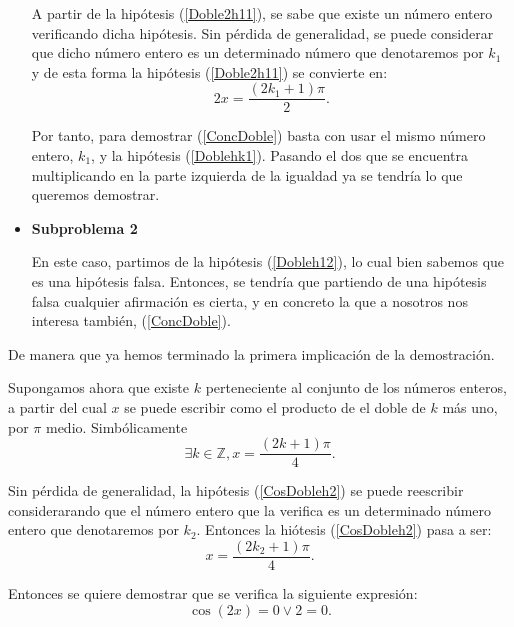\begin{demostracion}
\begin{itemize}
    A partir de la hipótesis (\ref{Doble2h11}), se sabe que existe
    un número entero verificando dicha hipótesis. Sin pérdida de
    generalidad, se puede considerar que dicho número entero es un
    determinado número que denotaremos por \(k_1\) y de esta forma
    la hipótesis (\ref{Doble2h11}) se convierte en:
    \begin{equation}\label{Doblehk1}\tag{hk1}
       2x=\frac{(2k_1+1)π}{2}.
    \end{equation}

    Por tanto, para demostrar (\ref{ConcDoble}) basta con usar
    el mismo número entero, \(k_1\), y la hipótesis
    (\ref{Doblehk1}). Pasando el dos que se encuentra multiplicando
    en la parte izquierda de la igualdad ya se tendría lo que
    queremos demostrar.

  \item \textbf{Subproblema 2}

    En este caso, partimos de la hipótesis (\ref{Dobleh12}), lo cual
    bien sabemos que es una hipótesis falsa. Entonces, se tendría
    que partiendo de una hipótesis falsa cualquier afirmación es
    cierta, y en concreto la que a nosotros nos interesa también,
    (\ref{ConcDoble}).
  \end{itemize}

  De manera que ya hemos terminado la primera implicación de la
  demostración.

   \noindent
   \framebox{\longleftarrow} Supongamos ahora que existe \(k\)
   perteneciente al conjunto de los números enteros, a partir del
   cual \(x\) se puede escribir como el producto de el doble de
   \(k \) más uno, por \( π \) medio. Simbólicamente
   \begin{equation}\label{CosDobleh2}\tag{h2}
      ∃ k ∈ ℤ, x=\frac{(2k+1)π}{4}.
    \end{equation}

    Sin pérdida de generalidad, la hipótesis (\ref{CosDobleh2}) se
    puede reescribir considerarando que el número entero que la
    verifica es un determinado número entero que denotaremos
    por \(k_2\).
    Entonces la hiótesis (\ref{CosDobleh2}) pasa a ser:
    \begin{equation}\label{hk2}\tag{hk2}
       x=\frac{(2k_2+1)π}{4}.
    \end{equation}

    Entonces se quiere demostrar que se verifica la siguiente
    expresión:
    \begin{equation}\label{ConcDoble2}
      \cos(2x)=0 \lor 2=0.
    \end{equation}


\end{demostracion}
